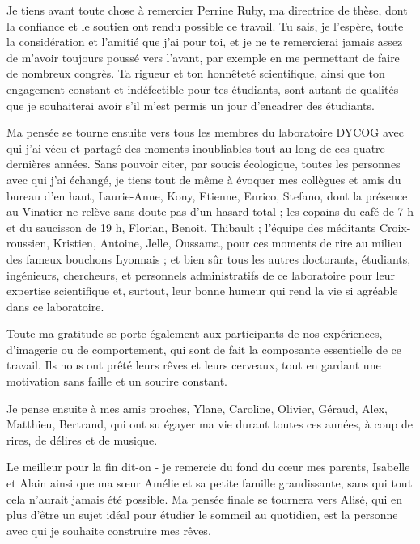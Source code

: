 \label{sec:acknowledgement}
\vspace*{-10mm}

Je tiens avant toute chose à remercier Perrine Ruby, ma directrice de thèse, dont la confiance et le soutien ont rendu possible ce travail. Tu sais, je l'espère, toute la considération et l'amitié que j'ai pour toi, et je ne te remercierai jamais assez de m'avoir toujours poussé vers l'avant, par exemple en me permettant de faire de nombreux congrès. Ta rigueur et ton honnêteté scientifique, ainsi que ton engagement constant et indéfectible pour tes étudiants, sont autant de qualités que je souhaiterai avoir s'il m'est permis un jour d'encadrer des étudiants.

Ma pensée se tourne ensuite vers tous les membres du laboratoire DYCOG avec qui j’ai vécu et partagé des moments inoubliables tout au long de ces quatre dernières années. Sans pouvoir citer, par soucis écologique, toutes les personnes avec qui j’ai échangé, je tiens tout de même à évoquer mes collègues et amis du bureau d’en haut, Laurie-Anne, Kony, Etienne, Enrico, Stefano, dont la présence au Vinatier ne relève sans doute pas d’un hasard total ; les copains du café de 7 h et du saucisson de 19 h, Florian, Benoit, Thibault ; l’équipe des méditants Croix-roussien, Kristien, Antoine, Jelle, Oussama, pour ces moments de rire au milieu des fameux bouchons Lyonnais ; et bien sûr tous les autres doctorants, étudiants, ingénieurs, chercheurs, et personnels administratifs de ce laboratoire pour leur expertise scientifique et, surtout, leur bonne humeur qui rend la vie si agréable dans ce laboratoire.

Toute ma gratitude se porte également aux participants de nos expériences, d’imagerie ou de comportement, qui sont de fait la composante essentielle de ce travail. Ils nous ont prêté leurs rêves et leurs cerveaux, tout en gardant une motivation sans faille et un sourire constant.

Je pense ensuite à mes amis proches, Ylane, Caroline, Olivier, Géraud, Alex, Matthieu, Bertrand, qui ont su égayer ma vie durant toutes ces années, à coup de rires, de délires et de musique.

Le meilleur pour la fin dit-on - je remercie du fond du cœur mes parents, Isabelle et Alain ainsi que ma sœur Amélie et sa petite famille grandissante, sans qui tout cela n'aurait jamais été possible. Ma pensée finale se tournera vers Alisé, qui en plus d’être un sujet idéal pour étudier le sommeil au quotidien, est la personne avec qui je souhaite construire mes rêves.
